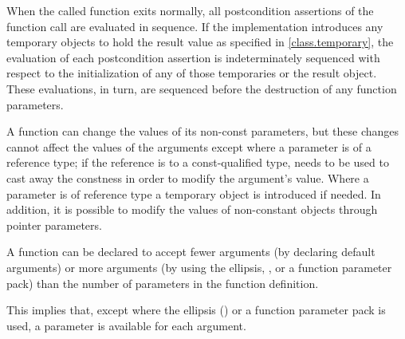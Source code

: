 \pnum
When the called function exits normally,
all postcondition assertions of the function call
are evaluated in sequence.
If the implementation introduces any temporary objects
to hold the result value as specified in \ref{class.temporary},
the evaluation of each postcondition assertion
is indeterminately sequenced with respect to
the initialization of any of those temporaries or the result object.
These evaluations, in turn, are sequenced before
the destruction of any function parameters.

\pnum
\begin{note}
%
%
%
%
%
%
A function can change the values of its non-const parameters, but these
changes cannot affect the values of the arguments except where a
parameter is of a reference type; if the reference is to
a const-qualified type,  needs to be used to
cast away the constness in order to modify the argument's value. Where a
parameter is of  reference type a temporary object is
introduced if
needed.
In addition, it is possible to modify the values of non-constant objects through
pointer parameters.
\end{note}

\pnum
{}%
%
A function can be declared to accept fewer arguments (by declaring default
arguments) or more arguments (by using the ellipsis,
, or a function parameter pack) than the number of
parameters in the function definition.
\begin{note}
This implies that, except where the ellipsis () or a function
parameter pack is used, a parameter is available for each argument.
\end{note}

